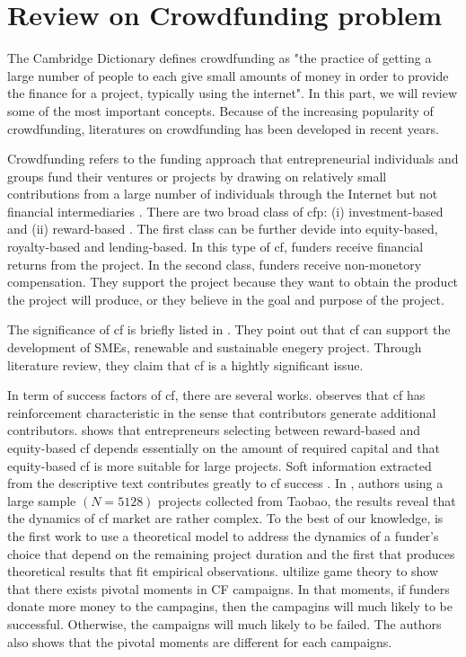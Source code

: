 \section{Review on Crowdfunding problem}

The Cambridge Dictionary \cite{2023} defines crowdfunding as
"the practice of getting a large number of people to each give small amounts of money in order to provide the finance for a project, typically using the internet".
In this part, we will review some of the most important concepts.
Because of the increasing popularity of crowdfunding, literatures on crowdfunding has been developed in recent years.


Crowdfunding refers to the funding approach that entrepreneurial individuals and groups
fund their ventures or projects by drawing on relatively small contributions
from a large number of individuals through the Internet but not financial intermediaries \cite{mollick2014}.
There are two broad class of \acrshort{cfp}: (i) investment-based and (ii) reward-based \cite{belleflamme2015}.
The first class can be further devide into equity-based, royalty-based and lending-based.
In this type of \acrshort{cf}, funders receive financial returns from the project.
In the second class, funders receive non-monetory compensation.
They support the project because they want to obtain the product the project will produce,
or they believe in the goal and purpose of the project.

The significance of \acrshort{cf} is briefly listed in \cite{xie2019}.
They point out that \acrshort{cf} can support the development of SMEs,
renewable and sustainable enegery project.
Through literature review, they claim that \acrshort{cf} is a hightly significant issue.

In term of success factors of \acrshort{cf}, there are several works.
\cite{colombo2015} observes that \acrshort{cf} has reinforcement characteristic in the sense that contributors generate additional contributors.
\cite{belleflamme2015} shows that entrepreneurs selecting between reward-based and equity-based \acrshort{cf} depends
essentially on the amount of required capital and that equity-based \acrshort{cf} is more suitable for large projects.
Soft information extracted from the descriptive text contributes greatly to \acrshort{cf} success \cite{jiang2020}.
In \cite{xie2019}, authors using a large sample $(N=5128)$ projects collected from Taobao,
the results reveal that the dynamics of \acrshort{cf} market are rather complex.
To the best of our knowledge, \cite{salahaldin2019} is the first work to use a theoretical model to address
the dynamics of a funder’s choice that depend on the remaining project duration
and the first that produces theoretical results that fit empirical observations.
\cite{lindasalahaldin2022} ultilize game theory to show that there exists pivotal moments in CF campaigns.
In that moments, if funders donate more money to the campagins, then the campagins will much likely to be successful.
Otherwise, the campaigns will much likely to be failed.
The authors also shows that the pivotal moments are different for each campaigns.

